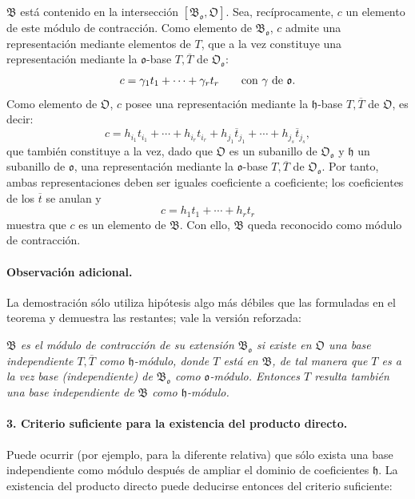 $\mathfrak B$ está contenido en la intersección $[\mathfrak B_{\mathfrak o},\mathfrak O]$. Sea, recíprocamente, $c$ un elemento de este módulo de contracción. Como elemento de $\mathfrak B_{\mathfrak o}$, $c$ admite una representación mediante elementos de $T$, que a la vez constituye una representación mediante la $\mathfrak o$-base $T,\overline T$ de $\mathfrak O_{\mathfrak o}$:
\[
c=\gamma_1t_1+\cdots+\gamma_rt_r
\qquad\hbox{con }\gamma\hbox{ de }\mathfrak o.
\]
Como elemento de $\mathfrak O$, $c$ posee una representación mediante la $\mathfrak h$-base $T,\overline T$ de $\mathfrak O$, es decir:
\[
c=h_{i_1}t_{i_1}+\cdots+h_{i_r}t_{i_r}+h_{j_1}\overline t_{j_1}+\cdots+h_{j_s}\overline t_{j_s},
\]
que también constituye a la vez, dado que $\mathfrak O$ es un subanillo de $\mathfrak O_{\mathfrak o}$ y $\mathfrak h$ un subanillo de $\mathfrak o$, una representación mediante la $\mathfrak o$-base $T,\overline T$ de $\mathfrak O_{\mathfrak o}$. Por tanto, ambas representaciones deben ser iguales coeficiente a coeficiente; los coeficientes de los $\overline t$ se anulan y
\[
c=h_1t_1+\cdots+h_rt_r
\]
muestra que $c$ es un elemento de $\mathfrak B$. Con ello, $\mathfrak B$ queda reconocido como módulo de contracción.

\paragraph{Observación adicional.}
La demostración sólo utiliza hipótesis algo más débiles que las formuladas en el teorema y demuestra las restantes; vale la versión reforzada:

\emph{$\mathfrak B$ es el módulo de contracción de su extensión $\mathfrak B_{\mathfrak o}$ si existe en $\mathfrak O$ una base independiente $T,\overline T$ como $\mathfrak h$-módulo, donde $T$ está en $\mathfrak B$, de tal manera que $T$ es a la vez base (independiente) de $\mathfrak B_{\mathfrak o}$ como $\mathfrak o$-módulo. Entonces $T$ resulta también una base independiente de $\mathfrak B$ como $\mathfrak h$-módulo.}

\paragraph{3. Criterio suficiente para la existencia del producto directo.}
Puede ocurrir (por ejemplo, para la diferente relativa) que sólo exista una base independiente como módulo después de ampliar el dominio de coeficientes $\mathfrak h$. La existencia del producto directo puede deducirse entonces del criterio suficiente:

